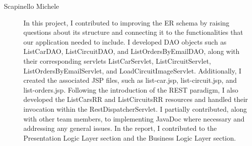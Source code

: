 \begin{description}
	\item[Scapinello Michele] In this project, I contributed to improving the ER schema by raising questions about its structure and connecting it to the functionalities that our application needed to include.
								I developed DAO objects such as ListCarDAO, ListCircuitDAO, and ListOrdersByEmailDAO, along with their corresponding servlets ListCarServlet, ListCircuitServlet, ListOrdersByEmailServlet, and LoadCircuitImageServlet.
	Additionally, I created the associated JSP files, such as list-car.jsp, list-circuit.jsp, and list-orders.jsp. Following the introduction of the REST paradigm, I also developed the ListCarsRR and ListCircuitsRR resources and handled their invocation within the RestDispatcherServlet.
	I partially contributed, along with other team members, to implementing JavaDoc where necessary and addressing any general issues.
	In the report, I contributed to the Presentation Logic Layer section and the Business Logic Layer section.

\end{description}
